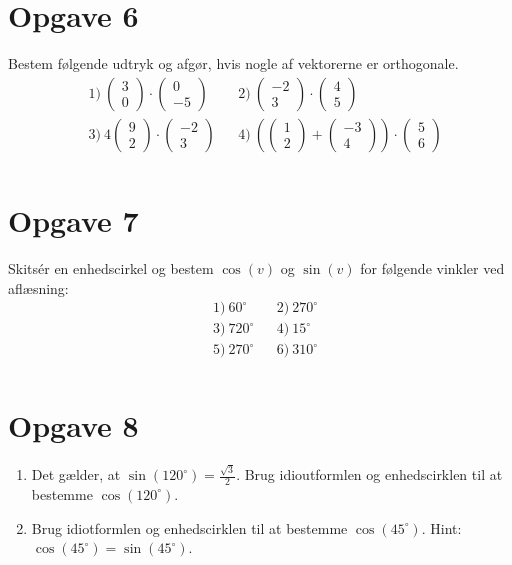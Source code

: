 \section*{Opgave 6}
Bestem følgende udtryk og afgør, hvis nogle af vektorerne er orthogonale.
\begin{align*}
&1) \ \begin{pmatrix} 3 \\ 0\end{pmatrix}\cdot \begin{pmatrix}0 \\ -5 \end{pmatrix}  &&2) \  \begin{pmatrix} -2 \\ 3\end{pmatrix}\cdot \begin{pmatrix}4 \\ 5 \end{pmatrix}    \\
&3) \  4 \begin{pmatrix} 9 \\ 2\end{pmatrix}\cdot \begin{pmatrix}-2 \\ 3 \end{pmatrix}  &&4) \   \left(\begin{pmatrix} 1 \\ 2\end{pmatrix} + \begin{pmatrix} -3 \\ 4\end{pmatrix} \right)\cdot  \begin{pmatrix} 5 \\ 6\end{pmatrix}  \\
\end{align*}

\section*{Opgave 7}
Skitsér en enhedscirkel og bestem $\cos(v)$ og $\sin(v)$ for følgende vinkler ved aflæsning:
\begin{align*}
&1) \ 60^\circ  &&2) \ 270^\circ   \\
&3) \ 720^\circ &&4) \ 15^\circ   \\
&5) \ 270^\circ &&6) \ 310^\circ   \\
\end{align*}

\section*{Opgave 8}
\begin{enumerate}[label=\roman*)]
\item Det gælder, at $\sin(120^\circ) = \frac{\sqrt{3}}{2}$. Brug idioutformlen og enhedscirklen til at bestemme $\cos(120^\circ)$.
\item Brug idiotformlen og enhedscirklen til at bestemme $\cos(45^\circ)$. Hint: $\cos(45^\circ) = \sin(45^\circ)$.
\end{enumerate}